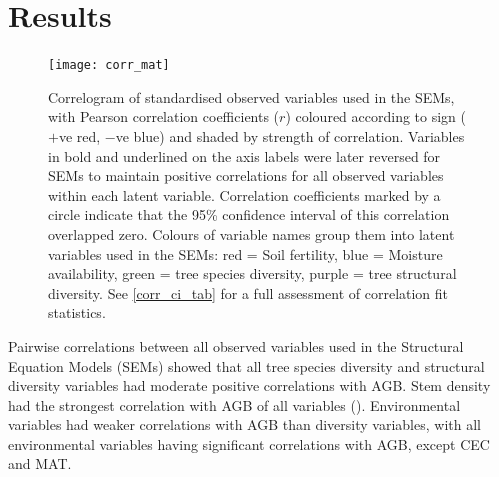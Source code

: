 \documentclass[11pt,a4paper]{article}
\begin{document}

\section{Results}

\begin{figure}[H]
\centering
	\texttt{[image: corr\_mat]}
	\caption{Correlogram of standardised observed variables used in the SEMs, with Pearson correlation coefficients ($r$) coloured according to sign ($+$ve red, $-$ve blue) and shaded by strength of correlation. Variables in bold and underlined on the axis labels were later reversed for SEMs to maintain positive correlations for all observed variables within each latent variable. Correlation coefficients marked by a circle indicate that the 95\% confidence interval of this correlation overlapped zero. Colours of variable names group them into latent variables used in the SEMs: red = Soil fertility, blue = Moisture availability, green = tree species diversity, purple = tree structural diversity. See \autoref{corr_ci_tab} for a full assessment of correlation fit statistics.}
	\label{corr_mat}
\end{figure}

Pairwise correlations between all observed variables used in the Structural Equation Models (SEMs) showed that all tree species diversity and structural diversity variables had moderate positive correlations with AGB. Stem density had the strongest correlation with AGB of all variables (\ccib{}). Environmental variables had weaker correlations with AGB than diversity variables, with all environmental variables having significant correlations with AGB, except CEC and MAT.
\end{document}
